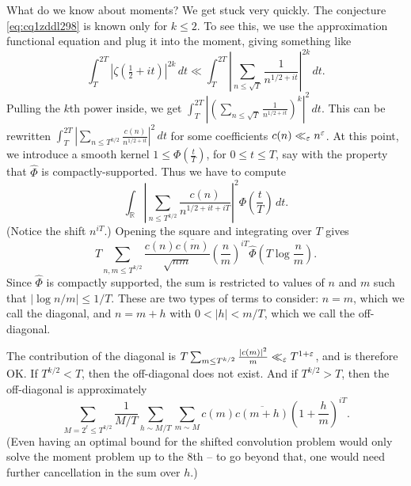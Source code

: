 \documentclass[reqno]{amsart} 
\numberwithin{theorem}{section}
\numberwithin{equation}{section}
\begin{document}
What do we know about moments?  We get stuck very quickly.  The conjecture \eqref{eq:cq1zddl298} is known only for $k \leq 2$.  To see this, we use the approximation functional equation and plug it into the moment, giving something like
\begin{equation*}
  \int_{T}^{2 T} \left\lvert \zeta(\tfrac{1}{2} + i t) \right\rvert^{2 k} \, d t
  \ll \int_T^{2 T}
  \left\lvert \sum_{n \leq \sqrt{T}} \frac{1}{n^{1/2 + i t}} \right\rvert^{2 k} \, d t.
\end{equation*}
Pulling the $k$th power inside, we get $\int_{T}^{2 T} \left\lvert \left( \sum_{n \leq \sqrt{T}} \frac{1}{n^{1/2 + i t}} \right)^k \right\rvert^2 \, d t$.  This can be rewritten $\int_T^{2 T} \left\lvert \sum_{n \leq T^{k/2}} \frac{c(n)}{n^{1/2 + i t}} \right\rvert^2 \, d t$ for some coefficients $c(n) \ll_\varepsilon n^\varepsilon$.  At this point, we introduce a smooth kernel $1 \leq \Phi(\tfrac{t}{T})$, for $0 \leq t \leq T$, say with the property that $\hat{\Phi}$ is compactly-supported.  Thus we have to compute
\begin{equation*}
  \int_{\mathbb{R}} \left\lvert
    \sum_{n \leq T^{k/2}}
    \frac{c(n)}{ n^{1/2 + i t + i T}}\right\rvert^2
  \Phi \left( \frac{t}{T} \right) \, d t.
\end{equation*}
(Notice the shift $n^{i T}$.)  Opening the square and integrating over $T$ gives
\begin{equation*}
  T \sum_{n, m \leq T^{k/2}}
  \frac{c(n) \overline{c(m)}}{\sqrt{n m}}
  \left( \frac{n}{m} \right)^{i T}
  \hat{\Phi} \left( T \log \frac{n}{m} \right).
\end{equation*}
Since $\hat{\Phi}$ is compactly supported, the sum is restricted to values of $n$ and $m$ such that $\left\lvert \log n/m \right\rvert \leq 1/T$.  These are two types of terms to consider: $n = m$, which we call the diagonal, and $n = m + h$ with $0 < \lvert h \rvert < m/T$, which we call the off-diagonal.

The contribution of the diagonal is $T \sum_{m \leq T^{k/2}} \frac{\lvert c(m) \rvert^2}{m} \ll_\varepsilon T^{1 + \varepsilon}$, and is therefore OK.  If $T^{k/2} < T$, then the off-diagonal does not exist.  And if $T^{k/2} > T$, then the off-diagonal is approximately
\begin{equation*}
  \sum_{M = 2^{\ell} \leq T^{k/2}}
  \frac{1}{ M /T}
  \sum_{h \sim M/T}
  \sum_{m \sim M}
  c(m) \overline{c(m + h)}
  \left( 1 + \frac{h}{m} \right)^{i T}.
\end{equation*}
(Even having an optimal bound for the shifted convolution problem would only solve the moment problem up to the $8$th -- to go beyond that, one would need further cancellation in the sum over $h$.)
\end{document}
